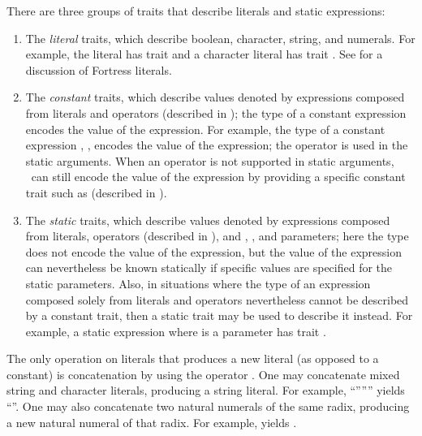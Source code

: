 There are three groups of traits that describe literals
and static expressions:
\begin{enumerate}
\item The \emph{literal} traits, which describe boolean,
  character, string, and numerals.  For example, the literal  has
  trait  and a
  character literal has trait .
See  for a discussion of Fortress literals.

\item The \emph{constant} traits, which describe values denoted by
expressions composed from literals and operators (described in
);
the type of a constant expression encodes the value of the expression.
For example, the type of a constant expression ,
,
encodes the value of the expression; the operator \EXP{+} is
used in the static arguments.  When an operator is not supported in static
arguments, \library\ can still encode the value of the expression by
providing a specific constant trait such as
(described in ).



\item The \emph{static} traits, which describe values denoted by
expressions composed from literals, operators (described in
), and , ,
and  parameters; here the type
does not encode the value of the expression, but the value of the
expression can nevertheless be known statically if specific
values are specified for the static parameters.  Also, in situations
where the type of an expression composed solely from literals and
operators nevertheless cannot be described by a constant trait, then a
static trait may be used to describe it instead.
For example, a static expression  where  is a
 parameter has trait .
\end{enumerate}


The only operation on literals that produces a new literal (as opposed
to a constant) is concatenation by using the operator \EXP{\|}.
One may concatenate mixed string and
character literals, producing a string literal.
For example, ``''\EXP{\|}'''' yields ``''.
One may also concatenate two natural numerals
of the same radix, producing a new natural numeral of that radix.
For example,  yields .

